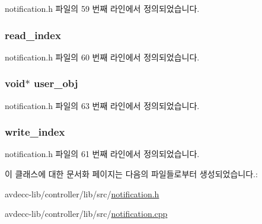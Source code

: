 notification.\+h 파일의 59 번째 라인에서 정의되었습니다.

\subsubsection[{\texorpdfstring{read\+\_\+index}{read_index}}]{ read\+\_\+index\hspace{0.3cm}{\ttfamily [protected]}}\hypertarget{classavdecc__lib_1_1notification_a2ccf0f8cb3b20ac18cc9c7bcff1084ad}{}\label{classavdecc__lib_1_1notification_a2ccf0f8cb3b20ac18cc9c7bcff1084ad}


notification.\+h 파일의 60 번째 라인에서 정의되었습니다.

\subsubsection[{\texorpdfstring{user\+\_\+obj}{user_obj}}]{\setlength{\rightskip}{0pt plus 5cm}void$\ast$ user\+\_\+obj\hspace{0.3cm}{\ttfamily [protected]}}\hypertarget{classavdecc__lib_1_1notification_af3646c45b560aeab38e708886dec0d93}{}\label{classavdecc__lib_1_1notification_af3646c45b560aeab38e708886dec0d93}


notification.\+h 파일의 63 번째 라인에서 정의되었습니다.

\subsubsection[{\texorpdfstring{write\+\_\+index}{write_index}}]{ write\+\_\+index\hspace{0.3cm}{\ttfamily [protected]}}\hypertarget{classavdecc__lib_1_1notification_a44d246646acf5f95a78a87d606f22a42}{}\label{classavdecc__lib_1_1notification_a44d246646acf5f95a78a87d606f22a42}


notification.\+h 파일의 61 번째 라인에서 정의되었습니다.



이 클래스에 대한 문서화 페이지는 다음의 파일들로부터 생성되었습니다.\+:\begin{DoxyCompactItemize}
\item 
avdecc-\/lib/controller/lib/src/\hyperlink{notification_8h}{notification.\+h}\item 
avdecc-\/lib/controller/lib/src/\hyperlink{notification_8cpp}{notification.\+cpp}\end{DoxyCompactItemize}
